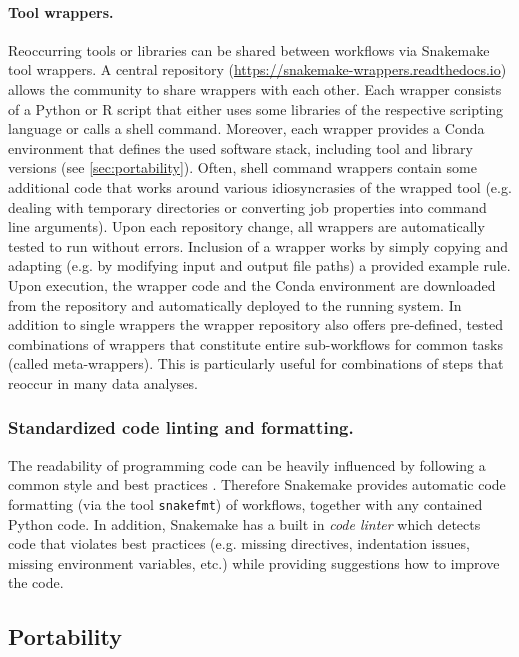 \documentclass[parskip=half]{scrartcl}
\let\plainurl\url
\renewcommand{\url}[1]{\protect\plainurl{#1}}
\begin{document}
\paragraph{Tool wrappers.}
Reoccurring tools or libraries can be shared between workflows via Snakemake tool wrappers.
A central repository (\url{https://snakemake-wrappers.readthedocs.io}) allows the community to share wrappers with each other.
Each wrapper consists of a Python or R script that either uses some libraries of the respective scripting language or calls a shell command.
Moreover, each wrapper provides a Conda environment that defines the used software stack, including tool and library versions (see \autoref{sec:portability}).
Often, shell command wrappers contain some additional code that works around various idiosyncrasies of the wrapped tool (e.g. dealing with temporary directories or converting job properties into command line arguments).
Upon each repository change, all wrappers are automatically tested to run without errors.
Inclusion of a wrapper works by simply copying and adapting (e.g. by modifying input and output file paths) a provided example rule.
Upon execution, the wrapper code and the Conda environment are downloaded from the repository and automatically deployed to the running system.
In addition to single wrappers the wrapper repository also offers pre-defined, tested combinations of wrappers that constitute entire sub-workflows for common tasks (called meta-wrappers).
This is particularly useful for combinations of steps that reoccur in many data analyses.

\subsubsection{Standardized code linting and formatting.}\label{sec:style}

The readability of programming code can be heavily influenced by following a common style and best practices \parencite{tysell_sundkvist_code_2017}.
Therefore Snakemake provides automatic code formatting (via the tool \lstinline!snakefmt!) of workflows, together with any contained Python code.
In addition, Snakemake has a built in \emph{code linter} which detects code that violates best practices (e.g. missing directives, indentation issues, missing environment variables, etc.) while providing suggestions how to improve the code.

\subsection{Portability}\label{sec:portability}
\end{document}
